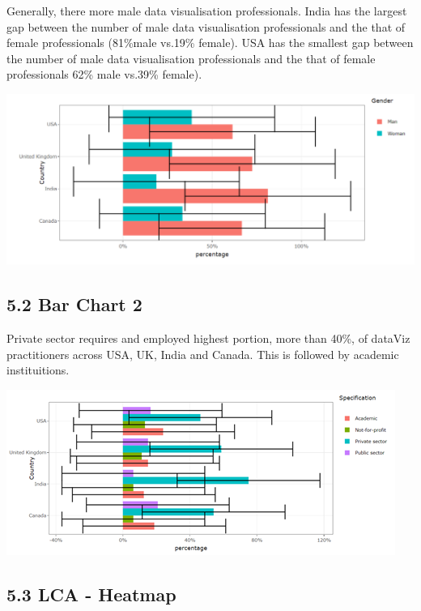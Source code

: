 \documentclass{acm_proc_article-sp}
\begin{document}
Generally, there more male data visualisation professionals. India has
the largest gap between the number of male data visualisation
professionals and the that of female professionals (81\%male vs.19\%
female). USA has the smallest gap between the number of male data
visualisation professionals and the that of female professionals 62\%
male vs.39\% female).

\begin{center}\includegraphics[width=1\linewidth]{7} \end{center}

\hypertarget{bar-chart-2}{%
\subsection{5.2 Bar Chart 2}\label{bar-chart-2}}

Private sector requires and employed highest portion, more than 40\%, of
dataViz practitioners across USA, UK, India and Canada. This is followed
by academic instituitions.

\begin{center}\includegraphics[width=1\linewidth]{9} \end{center}

\hypertarget{lca---heatmap}{%
\subsection{5.3 LCA - Heatmap}\label{lca---heatmap}}
\end{document}
